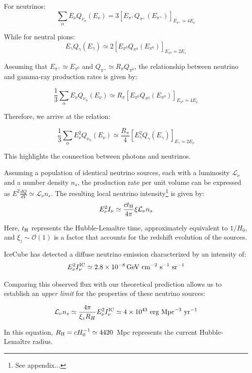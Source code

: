 For neutrinos:
\[
\sum_\alpha E_\nu Q_{\nu_\alpha}(E_\nu) = 3 \left[ E_{\pi^+} Q_{\pi^+} (E_{\pi^+}) \right]_{E_{\pi^+} \simeq 4 E_\nu}
\]

While for neutral pions:
\[
E_\gamma Q_\gamma(E_\gamma) \simeq 2 \left[ E_{\pi^0} Q_{\pi^0}(E_{\pi^0}) \right]_{E_{\pi^0} \simeq 2 E_\gamma}
\]

Assuming that \( E_{\pi^+} \simeq E_{\pi^0} \) and \( Q_{\pi^+} \simeq R_\pi Q_{\pi^0} \), the relationship between neutrino and gamma-ray production rates is given by:

\[
\frac{1}{3} \sum_\alpha E_\nu Q_{\nu_\alpha}(E_\nu) \simeq R_\pi \left[ E_{\pi^0} Q_{\pi^0} (E_{\pi^0}) \right]_{E_{\pi^0} \simeq 4 E_\nu}
\]

Therefore, we arrive at the relation:
%
\begin{remark}
\[
\frac{1}{3} \sum_\alpha E_\nu^2 Q_{\nu_\alpha}(E_\nu) \simeq \frac{R_\pi}{4} \left[ E^2_\gamma Q_{\gamma} (E_\gamma) \right]_{E_\gamma \simeq 2 E_\nu}
\] 
\end{remark}

This highlights the connection between photons and neutrinos.

Assuming a population of identical neutrino sources, each with a luminosity \(\mathcal L_\nu\) and a number density \(n_s\), the production rate per unit volume can be expressed as \(E^2\frac{dQ}{dV} \simeq \mathcal L_\nu n_s\). The resulting local neutrino intensity\footnote{See appendix...} is given by:
%
\[ E^2_\nu I_\nu \simeq \frac{c t_{\rm H}}{4\pi} \xi \mathcal L_\nu n_s \]

Here, \(t_{\rm H}\) represents the Hubble-Lemaître time, approximately equivalent to \(1/H_0\), and \(\xi_z \sim \mathcal O(1)\) is a factor that accounts for the redshift evolution of the sources.

IceCube has detected a diffuse neutrino emission characterized by an intensity of:
\[ E_\nu^2 I^{\rm IC}_\nu \simeq 2.8 \times 10^{-8} \, \text{GeV}~\text{cm}^{-2}~\text{s}^{-1}~\text{sr}^{-1} \]

Comparing this observed flux with our theoretical prediction allows us to establish an \emph{upper limit} for the properties of these neutrino sources:
%
\begin{remark}
\[
\mathcal L_\nu n_s \simeq \frac{4\pi}{\xi_z R_H} E_\nu^2 I^{\rm IC}_\nu \simeq 4 \times 10^{43}~\text{erg}~\text{Mpc}^{-3}~\text{yr}^{-1}  
\]
\end{remark}

In this equation, \(R_{\rm H} = c H_0^{-1} \simeq 4420\)~Mpc represents the current Hubble-Lemaître radius.

